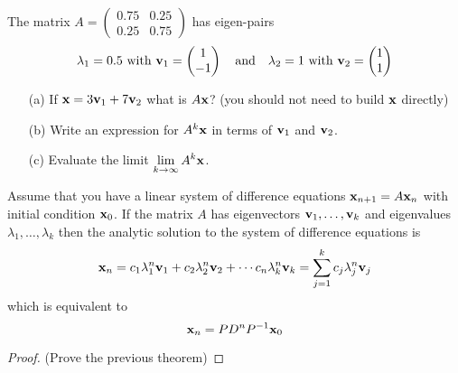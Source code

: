 \begin{problem}
    The matrix $A = \begin{pmatrix} 0.75 & 0.25 \\ 0.25 & 0.75 \end{pmatrix}$ has
    eigen-pairs
    \[ \lambda_1 = 0.5 \text{ with } {\bf v}_1 = \begin{pmatrix} 1 \\ -1 \end{pmatrix} \quad
        \text{and} \quad \lambda_2 = 1 \text{ with } {\bf v}_2 = \begin{pmatrix} 1 \\ 1
    \end{pmatrix} \]
    \begin{itemize}
        \item[(a)] If ${\bf x} = 3 {\bf v}_1 + 7 {\bf v}_2$ what is $A {\bf x}$? (you should not need to
            build ${\bf x}$ directly)
        \item[(b)] Write an expression for $A^k {\bf x}$ in terms of ${\bf v}_1$ and ${\bf v}_2$.
        \item[(c)] Evaluate the limit $\displaystyle \lim_{k \to \infty} A^k {\bf x}$.
    \end{itemize}
\end{problem}


\begin{thm}
    Assume that you have a linear system of difference equations ${\bf x}_{n+1} = A {\bf x}_n$
    with initial condition ${\bf x}_0$.  If the matrix $A$ has eigenvectors ${\bf v}_1,\dots,{\bf v}_k$
    and eigenvalues $\lambda_1, \dots,\lambda_k$ then the analytic solution to the system
    of difference equations is
    \[ {\bf x}_n = c_1 \lambda_1^n {\bf v}_1 + c_2 \lambda_2^n {\bf v}_2 + \cdots c_n \lambda_k^n {\bf v}_k
    = \sum_{j=1}^k c_j \lambda_j^n{\bf v}_j \]
    which is equivalent to
    \[ {\bf x}_n = PD^nP^{-1} {\bf x}_0 \]
\end{thm}
\begin{proof}
    (Prove the previous theorem)
\end{proof}


